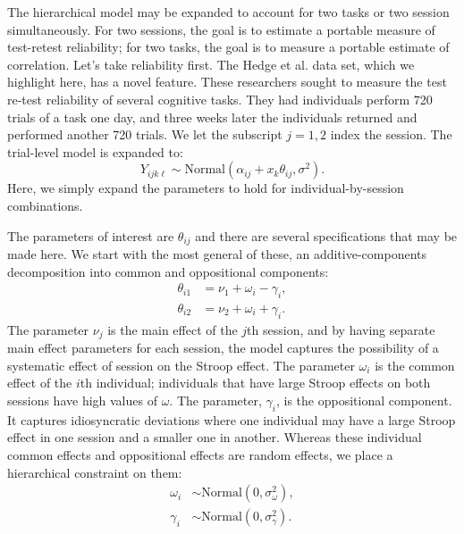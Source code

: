 \documentclass[english,man]{apa6}
\theoremstyle{definition}
\theoremstyle{definition}
\theoremstyle{remark}
\begin{document}
The hierarchical model may be expanded to account for two tasks or two
session simultaneously. For two sessions, the goal is to estimate a
portable measure of test-retest reliability; for two tasks, the goal is
to measure a portable estimate of correlation. Let's take reliability
first. The Hedge et al. data set, which we highlight here, has a novel
feature. These researchers sought to measure the test re-test
reliability of several cognitive tasks. They had individuals perform 720
trials of a task one day, and three weeks later the individuals returned
and performed another 720 trials. We let the subscript \(j=1,2\) index
the session. The trial-level model is expanded to: \[
Y_{ijk\ell} \sim \mbox{Normal}(\alpha_{ij}+x_k\theta_{ij},\sigma^2).
\] Here, we simply expand the parameters to hold for
individual-by-session combinations.

The parameters of interest are \(\theta_{ij}\) and there are several
specifications that may be made here. We start with the most general of
these, an additive-components decomposition into common and oppositional
components: \[
\begin{aligned}
\theta_{i1} &= \nu_1 + \omega_i - \gamma_i,\\
\theta_{i2} &= \nu_2 + \omega_i + \gamma_i.
\end{aligned}
\] The parameter \(\nu_j\) is the main effect of the \(j\)th session,
and by having separate main effect parameters for each session, the
model captures the possibility of a systematic effect of session on the
Stroop effect. The parameter \(\omega_i\) is the common effect of the
\(i\)th individual; individuals that have large Stroop effects on both
sessions have high values of \(\omega\). The parameter, \(\gamma_i\), is
the oppositional component. It captures idiosyncratic deviations where
one individual may have a large Stroop effect in one session and a
smaller one in another. Whereas these individual common effects and
oppositional effects are random effects, we place a hierarchical
constraint on them: \[
\begin{aligned}
\omega_i &\sim \mbox{Normal}(0,\sigma^2_\omega),\\
\gamma_i &\sim \mbox{Normal}(0,\sigma^2_\gamma).
\end{aligned}
\]
\end{document}
